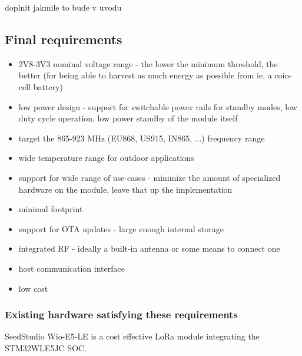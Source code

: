 doplnit jakmile to bude v uvodu

\subsection{\label{section:final-requirements} Final requirements}
\begin{itemize}
    \item 2V8-3V3 nominal voltage range - the lower the minimum threshold, the better (for being able to harvest as much energy as possible from ie. a coin-cell battery)
    \item low power design - support for switchable power rails for standby modes, low duty cycle operation, low power standby of the module itself
    \item target the 865-923 MHz (EU868, US915, IN865, ...) frequency range
    \item wide temperature range for outdoor applications
    \item support for wide range of use-cases - minimize the amount of specialized hardware on the module, leave that up the implementation
    \item minimal footprint
    \item support for OTA updates - large enough internal storage
    \item integrated RF - ideally a built-in antenna or some means to connect one
    \item host communication interface
    \item low cost
\end{itemize}

\subsubsection{Existing hardware satisfying these requirements}

SeedStudio Wio-E5-LE \cite{stmicroelectronics_lora_2024, seeedstudio_wio-e5-wireless_2024} is a cost effective LoRa module integrating the STM32WLE5JC SOC.


